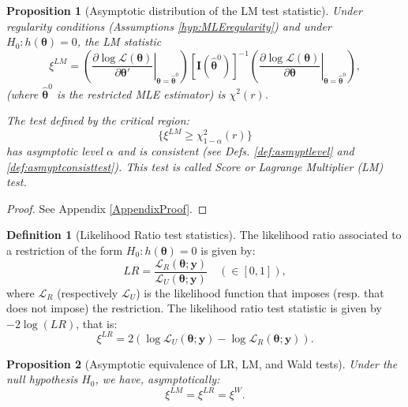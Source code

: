 \documentclass[
  12pt,
]{book}
\newtheorem{proposition}{Proposition}[chapter]
\theoremstyle{definition}
\newtheorem{definition}{Definition}[chapter]
\theoremstyle{definition}
\theoremstyle{definition}
\theoremstyle{definition}
\theoremstyle{remark}
\begin{document}
\begin{proposition}[Asymptotic distribution of the LM test statistic]
\protect\hypertarget{prp:LMdistri}{}\label{prp:LMdistri}Under regularity conditions (Assumptions \ref{hyp:MLEregularity}) and under \(H_0: h(\boldsymbol\theta)=0\), the LM statistic
\begin{equation}
\boxed{\xi^{LM} =
\left(\left.\frac{\partial \log \mathcal{L}(\boldsymbol\theta)}{\partial \boldsymbol\theta'}\right|_{\boldsymbol\theta = \hat{\boldsymbol\theta}^0}  \right)
[\mathbf{I}(\hat{\boldsymbol\theta}^0)]^{-1}
\left(\left.\frac{\partial \log \mathcal{L}(\boldsymbol\theta)}{\partial \boldsymbol\theta }\right|_{\boldsymbol\theta = \hat{\boldsymbol\theta}^0}  \right),} \label{eq:xiLM}
\end{equation}
(where \(\hat{\boldsymbol\theta}^0\) is the restricted MLE estimator) is \(\chi^2(r)\).

The test defined by the critical region:
\[
\{\xi^{LM} \ge \chi^2_{1-\alpha}(r)\}
\]
has asymptotic level \(\alpha\) and is consistent (see Defs. \ref{def:asmyptlevel} and \ref{def:asmyptconsisttest}). This test is called \emph{Score} or \emph{Lagrange Multiplier (LM)} test.
\end{proposition}

\begin{proof}
See Appendix \ref{AppendixProof}.
\end{proof}

\begin{definition}[Likelihood Ratio test statistics]
\protect\hypertarget{def:LR}{}\label{def:LR}The likelihood ratio associated to a restriction of the form \(H_0: h({\boldsymbol\theta})=0\) is given by:
\[
LR = \frac{\mathcal{L}_R(\boldsymbol\theta;\mathbf{y})}{\mathcal{L}_U(\boldsymbol\theta;\mathbf{y})} \quad (\in [0,1]),
\]
where \(\mathcal{L}_R\) (respectively \(\mathcal{L}_U\)) is the likelihood function that imposes (resp. that does not impose) the restriction. The likelihood ratio test statistic is given by \(-2\log(LR)\), that is:
\[
\boxed{\xi^{LR}= 2 (\log\mathcal{L}_U(\boldsymbol\theta;\mathbf{y})-\log\mathcal{L}_R(\boldsymbol\theta;\mathbf{y})).}
\]
\end{definition}

\begin{proposition}[Asymptotic equivalence of LR, LM, and Wald tests]
\protect\hypertarget{prp:equivLRLMW}{}\label{prp:equivLRLMW}Under the null hypothesis \(H_0\), we have, asymptotically:
\[
\xi^{LM} = \xi^{LR} = \xi^{W}.
\]
\end{proposition}
\end{document}
